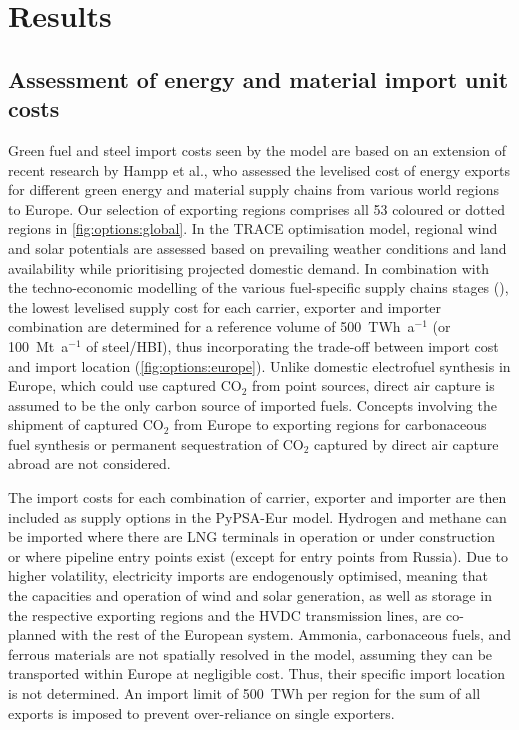 
\section*{Results}

\subsection*{Assessment of energy and material import unit costs}



Green fuel and steel import costs seen by the model are based on an extension of
recent research by Hampp et al.,\cite{hamppImportOptions2023} who assessed the
levelised cost of energy exports for different green energy and material supply
chains from various world regions to Europe. Our selection of exporting regions
comprises all 53 coloured or dotted regions in \cref{fig:options:global}. In the
TRACE optimisation model,\cite{hamppImportOptions2023} regional wind and solar
potentials are assessed based on prevailing weather conditions and land
availability while prioritising projected domestic demand. In combination with
the techno-economic modelling of the various fuel-specific supply chains stages
(), the lowest levelised supply cost for each
carrier, exporter and importer combination are determined for a reference volume
of 500~TWh~a$^{-1}$ (or 100~Mt~a$^{-1}$ of steel/HBI), thus incorporating the
trade-off between import cost and import location (\cref{fig:options:europe}).
Unlike domestic electrofuel synthesis in Europe, which could use captured CO$_2$
from point sources, direct air capture is assumed to be the only carbon source
of imported fuels. Concepts involving the shipment of captured CO$_2$ from
Europe to exporting regions for carbonaceous fuel synthesis or permanent
sequestration of CO$_2$ captured by direct air capture abroad are not
considered.\cite{treeenergysolutionsGreenCycle2024,fonderSyntheticMethaneClosing2024}


The import costs for each combination of carrier, exporter and importer are then
included as supply options in the PyPSA-Eur model. Hydrogen and methane can be
imported where there are LNG terminals in operation or under construction or
where pipeline entry points exist (except for entry points from Russia). Due to
higher volatility, electricity imports are endogenously optimised, meaning that
the capacities and operation of wind and solar generation, as well as storage in
the respective exporting regions and the HVDC transmission lines, are co-planned
with the rest of the European system. Ammonia, carbonaceous fuels, and ferrous
materials are not spatially resolved in the model, assuming they can be
transported within Europe at negligible cost. Thus, their specific import
location is not determined. An import limit of 500~TWh per region for the sum of
all exports is imposed to prevent over-reliance on single exporters.

